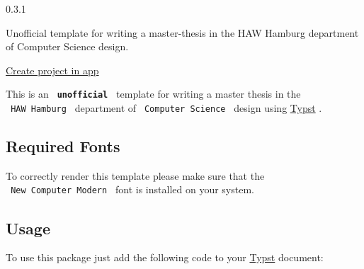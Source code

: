 { 0.3.1 }

Unofficial template for writing a master-thesis in the HAW Hamburg
department of Computer Science design.

\href{/app?template=haw-hamburg-master-thesis&version=0.3.1}{Create
project in app}

\label{readme}
This is an \textbf{\texttt{\ unofficial\ }} template for writing a
master thesis in the \texttt{\ HAW\ Hamburg\ } department of
\texttt{\ Computer\ Science\ } design using
\href{https://github.com/typst/typst}{Typst} .

\subsection{Required Fonts}\label{required-fonts}

To correctly render this template please make sure that the
\texttt{\ New\ Computer\ Modern\ } font is installed on your system.

\subsection{Usage}\label{usage}

To use this package just add the following code to your
\href{https://github.com/typst/typst}{Typst} document:

\begin{Shaded}
\begin{Highlighting}[]




\NormalTok{)}
\end{Highlighting}
\end{Shaded}

